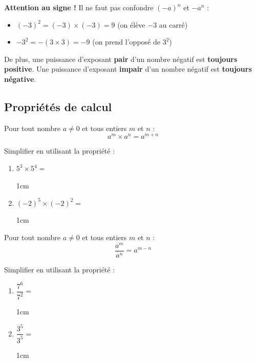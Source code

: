 \documentclass[a4paper]{book}
\begin{document}
    \begin{remarque}
        \textbf{Attention au signe !} Il ne faut pas confondre $(-a)^n$ et $-a^n$ :
        \begin{itemize}
            \item $(-3)^2 = (-3) \times (-3) = 9$ \quad (on élève $-3$ au carré)
            \item $-3^2 = -(3 \times 3) = -9$ \quad (on prend l'opposé de $3^2$)
        \end{itemize}
        De plus, une puissance d'exposant \textbf{pair} d'un nombre négatif est \textbf{toujours positive}.
        Une puissance d'exposant \textbf{impair} d'un nombre négatif est \textbf{toujours négative}.
    \end{remarque}


\subsection{Propriétés de calcul}

    \begin{propriete}
        Pour tout nombre $a \neq 0$ et tous entiers $m$ et $n$ :
        \[
            a^m \times a^n = a^{m+n}
        \]
    \end{propriete}

    \begin{exemple}
        Simplifier en utilisant la propriété :
        \begin{enumerate}
            \item $5^3 \times 5^4 = $
            \begin{ZoneReponse}{1cm}
            \end{ZoneReponse}

            \item $(-2)^5 \times (-2)^2 = $
            \begin{ZoneReponse}{1cm}
            \end{ZoneReponse}
        \end{enumerate}
    \end{exemple}

    \begin{propriete}
        Pour tout nombre $a \neq 0$ et tous entiers $m$ et $n$ :
        \[
            \frac{a^m}{a^n} = a^{m-n}
        \]
    \end{propriete}

    \begin{exemple}
        Simplifier en utilisant la propriété :
        \begin{enumerate}
            \item $\dfrac{7^6}{7^2} = $
            \begin{ZoneReponse}{1cm}
            \end{ZoneReponse}

            \item $\dfrac{3^5}{3^5} = $
            \begin{ZoneReponse}{1cm}
            \end{ZoneReponse}
        \end{enumerate}
    \end{exemple}
\end{document}
